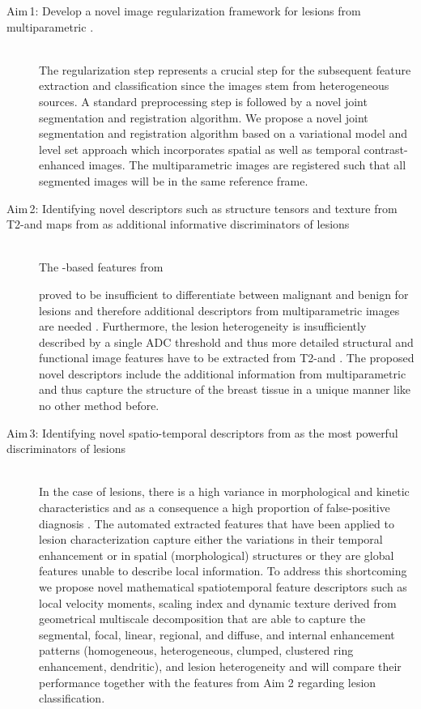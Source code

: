 \begin{description}
\item [Aim\,1: Develop a novel image regularization framework for \nmle lesions from multiparametric \mri.] \hfill \\
  The regularization step represents a crucial step for the subsequent feature
  extraction and classification since the images stem from heterogeneous
  sources. A standard preprocessing step is followed by a novel joint
  segmentation and registration algorithm. We propose a novel joint
  segmentation and registration algorithm based on a variational model and
  level set approach which incorporates spatial as well as temporal
  contrast-enhanced images.
  The multiparametric images are registered such that all segmented images will
  be in the same reference frame.

  \item [Aim\,2: Identifying novel descriptors such as structure tensors and texture from T2-\mri and \ivim maps from \dwi as additional informative discriminators of \nmle lesions] \hfill \\
    The \birads-based features from \cemri

    proved to be insufficient to differentiate between malignant and benign for
    \nmle lesions and therefore additional descriptors from multiparametric
    images are needed \cite{pinker2013combined}. Furthermore, the lesion heterogeneity is
    insufficiently described by a single ADC threshold
    and thus more detailed structural and functional image features have to be
    extracted from T2-\mri and \dwi. The proposed novel descriptors include the
    additional information from multiparametric \mri and thus capture the
    structure of the breast tissue in a unique manner like no other method
    before.

  \item [Aim\,3: Identifying novel spatio-temporal descriptors from \cemri as the most powerful discriminators of \nmle lesions]
  \hfill \\

  In the case of \nmle lesions, there is a high variance in morphological and
  kinetic characteristics and as a consequence a high proportion of
  false-positive diagnosis \cite{liu2013intravoxel}. The automated extracted features
  that have been applied to lesion characterization capture either the
  variations in their temporal enhancement or in spatial (morphological)
  structures or they are global features unable to describe local information.
  To address this shortcoming we propose novel mathematical spatiotemporal
  feature descriptors such as local velocity moments, scaling index and dynamic
  texture derived from geometrical multiscale decomposition that are able to
  capture the segmental, focal, linear, regional, and diffuse, and internal
  enhancement patterns (homogeneous, heterogeneous, clumped, clustered ring
  enhancement, dendritic), and lesion heterogeneity and will compare their
  performance together with the features from Aim 2 regarding lesion
  classification.


\end{description}
